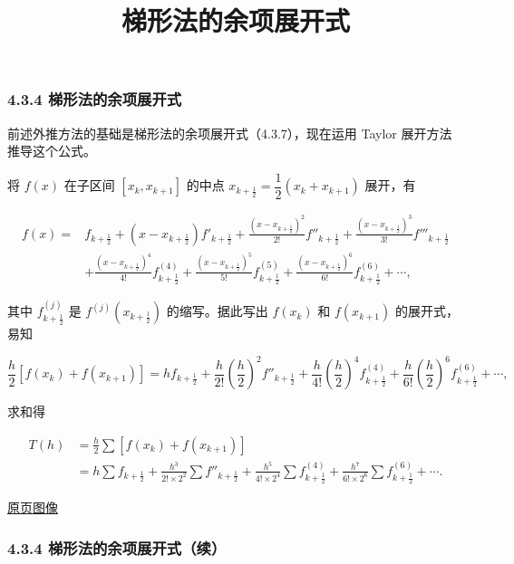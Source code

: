 \documentclass[
  10pt,
  fontset=fandol]{ctexart}
\title{梯形法的余项展开式}
\author{}
\date{}
\begin{document}
\maketitle

\subsubsection{4.3.4 梯形法的余项展开式}\label{ux68afux5f62ux6cd5ux7684ux4f59ux9879ux5c55ux5f00ux5f0f}

前述外推方法的基础是梯形法的余项展开式（4.3.7），现在运用 Taylor 展开方法推导这个公式。

将 \(f(x)\) 在子区间 \([x_k,x_{k+1}]\) 的中点 \(x_{k+\frac12}=\dfrac12(x_k+x_{k+1})\) 展开，有

\[
\begin{aligned}
f(x)={}&f_{k+\frac12}+(x-x_{k+\frac12})f'_{k+\frac12}
+\frac{(x-x_{k+\frac12})^2}{2!}f''_{k+\frac12}
+\frac{(x-x_{k+\frac12})^3}{3!}f'''_{k+\frac12}\\
&+\frac{(x-x_{k+\frac12})^4}{4!}f^{(4)}_{k+\frac12}
+\frac{(x-x_{k+\frac12})^5}{5!}f^{(5)}_{k+\frac12}
+\frac{(x-x_{k+\frac12})^6}{6!}f^{(6)}_{k+\frac12}+\cdots,
\end{aligned}
\tag{4.3.14}
\]

其中 \(f^{(j)}_{k+\frac12}\) 是 \(f^{(j)}(x_{k+\frac12})\) 的缩写。据此写出 \(f(x_k)\) 和 \(f(x_{k+1})\) 的展开式，易知

\[
\frac h2[f(x_k)+f(x_{k+1})]
=hf_{k+\frac12}+\frac h{2!}\left(\frac h2\right)^2f''_{k+\frac12}
+\frac h{4!}\left(\frac h2\right)^4f^{(4)}_{k+\frac12}
+\frac h{6!}\left(\frac h2\right)^6f^{(6)}_{k+\frac12}+\cdots,
\]

求和得

\[
\begin{aligned}
T(h)&=\frac h2\sum[f(x_k)+f(x_{k+1})]\\
&=h\sum f_{k+\frac12}+\frac{h^3}{2!\times2^2}\sum f''_{k+\frac12}
+\frac{h^5}{4!\times2^4}\sum f^{(4)}_{k+\frac12}
+\frac{h^7}{6!\times2^6}\sum f^{(6)}_{k+\frac12}+\cdots.
\end{aligned}
\tag{4.3.15}
\]

\href{../../source-images/pdf-106.jpeg}{原页图像}

\subsubsection{4.3.4 梯形法的余项展开式（续）}\label{ux68afux5f62ux6cd5ux7684ux4f59ux9879ux5c55ux5f00ux5f0fux7eed}
\end{document}
